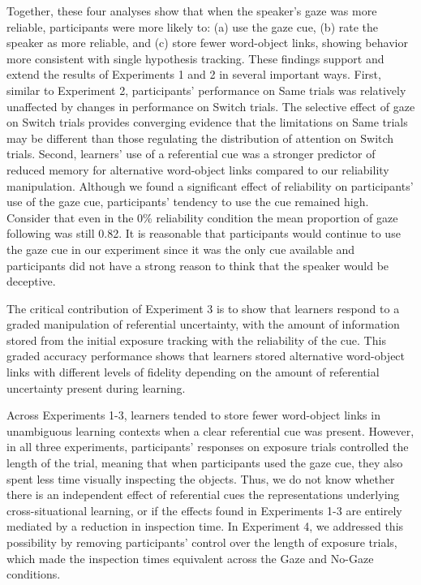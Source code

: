 \documentclass[authoryear, review]{elsarticle}
\begin{document}
Together, these four analyses show that when the speaker's gaze was more
reliable, participants were more likely to: (a) use the gaze cue, (b)
rate the speaker as more reliable, and (c) store fewer word-object
links, showing behavior more consistent with single hypothesis tracking.
These findings support and extend the results of Experiments 1 and 2 in
several important ways. First, similar to Experiment 2, participants'
performance on Same trials was relatively unaffected by changes in
performance on Switch trials. The selective effect of gaze on Switch
trials provides converging evidence that the limitations on Same trials
may be different than those regulating the distribution of attention on
Switch trials. Second, learners' use of a referential cue was a stronger
predictor of reduced memory for alternative word-object links compared
to our reliability manipulation. Although we found a significant effect
of reliability on participants' use of the gaze cue, participants'
tendency to use the cue remained high. Consider that even in the 0\%
reliability condition the mean proportion of gaze following was still
0.82. It is reasonable that participants would continue to use the gaze
cue in our experiment since it was the only cue available and
participants did not have a strong reason to think that the speaker
would be deceptive.

The critical contribution of Experiment 3 is to show that learners
respond to a graded manipulation of referential uncertainty, with the
amount of information stored from the initial exposure tracking with the
reliability of the cue. This graded accuracy performance shows that
learners stored alternative word-object links with different levels of
fidelity depending on the amount of referential uncertainty present
during learning.

Across Experiments 1-3, learners tended to store fewer word-object links
in unambiguous learning contexts when a clear referential cue was
present. However, in all three experiments, participants' responses on
exposure trials controlled the length of the trial, meaning that when
participants used the gaze cue, they also spent less time visually
inspecting the objects. Thus, we do not know whether there is an
independent effect of referential cues the representations underlying
cross-situational learning, or if the effects found in Experiments 1-3
are entirely mediated by a reduction in inspection time. In Experiment
4, we addressed this possibility by removing participants' control over
the length of exposure trials, which made the inspection times
equivalent across the Gaze and No-Gaze conditions.
\end{document}
